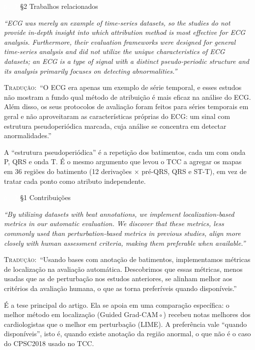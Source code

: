\documentclass[11pt,a4paper]{article}
\newcommand{\pagechip}[1]{{\setlength{\fboxsep}{1.5pt}\colorbox{cAcc}{\textcolor{white}{\scriptsize\texttt{#1}}}}}
\newenvironment{origquote}{\par\itshape\small}{\par}
\newenvironment{tradquote}{\par\small\textsc{Tradução:}\ }{\par}
\newcommand{\explab}[1]{\par\smallskip{\small\color{cAcc}\textbf{\MakeUppercase{#1}}}\par}
\begin{document}
\begin{citacard}{\pagechip{p. 2} §2 Trabalhos relacionados}
\begin{origquote}“ECG was merely an example of time-series datasets, so the studies do not provide in-depth insight into which attribution method is most effective for ECG analysis. Furthermore, their evaluation frameworks were designed for general time-series analysis and did not utilize the unique characteristics of ECG datasets; an ECG is a type of signal with a distinct pseudo-periodic structure and its analysis primarily focuses on detecting abnormalities.”\end{origquote}
\begin{tradquote}“O ECG era apenas um exemplo de série temporal, e esses estudos não mostram a fundo qual método de atribuição é mais eficaz na análise do ECG. Além disso, os seus protocolos de avaliação foram feitos para séries temporais em geral e não aproveitaram as características próprias do ECG: um sinal com estrutura pseudoperiódica marcada, cuja análise se concentra em detectar anormalidades.”\end{tradquote}
\explab{Explicação}
A “estrutura pseudoperiódica” é a repetição dos batimentos, cada um com onda P, QRS e onda T. É o mesmo argumento que levou o TCC a agregar os mapas em 36 regiões do batimento (12 derivações × pré-QRS, QRS e ST-T), em vez de tratar cada ponto como atributo independente.
\end{citacard}

\begin{citacard}{\pagechip{p. 2} §1 Contribuições}
\begin{origquote}“By utilizing datasets with beat annotations, we implement localization-based metrics in our automatic evaluation. We discover that these metrics, less commonly used than perturbation-based metrics in previous studies, align more closely with human assessment criteria, making them preferable when available.”\end{origquote}
\begin{tradquote}“Usando bases com anotação de batimentos, implementamos métricas de localização na avaliação automática. Descobrimos que essas métricas, menos usadas que as de perturbação nos estudos anteriores, se alinham melhor aos critérios da avaliação humana, o que as torna preferíveis quando disponíveis.”\end{tradquote}
\explab{Explicação}
É a tese principal do artigo. Ela se apoia em uma comparação específica: o melhor método em localização (Guided Grad-CAM◦) recebeu notas melhores dos cardiologistas que o melhor em perturbação (LIME). A preferência vale “quando disponíveis”, isto é, quando existe anotação da região anormal, o que não é o caso do CPSC2018 usado no TCC.
\end{citacard}
\end{document}
